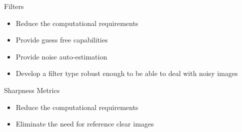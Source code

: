 \begin{description}
\item{Filters}
	\begin{itemize}
	\item{Reduce the computational requirements}
	\item{Provide guess free capabilities}
	\item{Provide noise auto-estimation}
	\item{Develop a filter type robust enough to be able to deal with noisy images}
	\end{itemize}
\item{Sharpness Metrics}
	\begin{itemize}
	\item{Reduce the computational requirements}
	\item{Eliminate the need for reference clear images}
	
	\end{itemize}
\end{description}










\newpage
